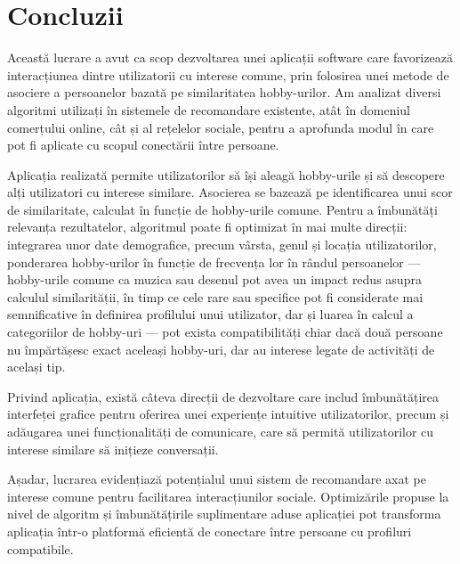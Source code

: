 \chapter{Concluzii}
\label{conclusions}

Această lucrare a avut ca scop dezvoltarea unei aplicații software care favorizează interacțiunea dintre utilizatorii cu interese comune, prin folosirea unei metode de asociere a persoanelor bazată pe similaritatea hobby-urilor.
Am analizat diversi algoritmi utilizați în sistemele de recomandare existente, atât în domeniul comerțului online, cât și al rețelelor sociale, pentru a aprofunda modul în care pot fi aplicate cu scopul conectării între persoane.
\par
Aplicația realizată permite utilizatorilor să își aleagă hobby-urile și să descopere alți utilizatori cu interese similare.
Asocierea se bazează pe identificarea unui scor de similaritate, calculat în funcție de hobby-urile comune.
Pentru a îmbunătăți relevanța rezultatelor, algoritmul poate fi optimizat în mai multe direcții: integrarea unor date demografice, precum vârsta, genul și locația utilizatorilor, ponderarea hobby-urilor în funcție de frecvența lor în rândul persoanelor --- hobby-urile comune ca muzica sau desenul pot avea un impact redus asupra calculul similarității, în timp ce cele rare sau specifice pot fi considerate mai semnificative în definirea profilului unui utilizator, dar și luarea în calcul a categoriilor de hobby-uri --- pot exista compatibilități chiar dacă două persoane nu împărtășesc exact aceleași hobby-uri, dar au interese legate de activități de același tip.
\par
Privind aplicația, există câteva direcții de dezvoltare care includ îmbunătățirea interfeței grafice pentru oferirea unei experiențe intuitive utilizatorilor, precum și adăugarea unei funcționalități de comunicare, care să permită utilizatorilor cu interese similare să inițieze conversații.
\par
Așadar, lucrarea evidențiază potențialul unui sistem de recomandare axat pe interese comune pentru facilitarea interacțiunilor sociale. 
Optimizările propuse la nivel de algoritm și îmbunătățirile suplimentare aduse aplicației pot transforma aplicația într-o platformă eficientă de conectare între persoane cu profiluri compatibile.